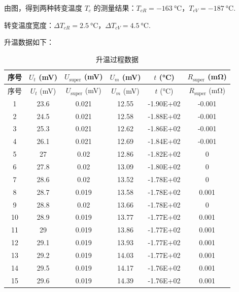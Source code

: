 \documentclass{THUexprep}
\begin{document}
由图，得到两种转变温度 $T_c$ 的测量结果：$T_{cR}=\SI{-163}{\celsius}$，$T_{cV}=\SI{-187}{\celsius}$.

转变温度宽度：$\Delta T_{cR} = \SI{2.5}{\celsius}$，$\Delta T_{cV}=\SI{4.5}{\celsius}$.

升温数据如下：

\begin{longtable}{|c|c|c|c|c|c|}
    \caption{升温过程数据} \\
    \hline
    序号 & $U_t$ (\si{\milli\volt}) & $U_{\text{super}}$ (\si{\milli\volt})  & $U_m$ (\si{\milli\volt}) & $t$ (\si{\celsius})    & $R_\text{super}$ (\si{\milli\ohm}) \\
    \hline
    \endfirsthead
    \hline
    序号 & $U_t$ (\si{\milli\volt}) & $U_{\text{super}}$ (\si{\milli\volt})  & $U_m$ (\si{\milli\volt}) & $t$ (\si{\celsius})    & $R_\text{super}$ (\si{\milli\ohm}) \\
    \hline
    \endhead
    \hline
    1     & 23.6  & 0.021 & 12.55 & -1.90E+02 & -0.001 \\
    \hline
    2     & 24.5  & 0.021 & 12.58 & -1.88E+02 & -0.001 \\
    \hline
    3     & 25.3  & 0.021 & 12.62 & -1.86E+02 & -0.001 \\
    \hline
    4     & 26.1  & 0.021 & 12.69 & -1.84E+02 & -0.001 \\
    \hline
    5     & 27    & 0.02  & 12.86 & -1.82E+02 & 0 \\
    \hline
    6     & 27.8  & 0.02  & 13.09 & -1.80E+02 & 0 \\
    \hline
    7     & 28.6  & 0.02  & 13.52 & -1.78E+02 & 0 \\
    \hline
    8     & 28.7  & 0.019 & 13.58 & -1.78E+02 & 0.001 \\
    \hline
    9     & 28.8  & 0.02  & 13.66 & -1.78E+02 & 0 \\
    \hline
    10    & 28.9  & 0.019 & 13.77 & -1.77E+02 & 0.001 \\
    \hline
    11    & 29    & 0.019 & 13.86 & -1.77E+02 & 0.001 \\
    \hline
    12    & 29.1  & 0.019 & 13.93 & -1.77E+02 & 0.001 \\
    \hline
    13    & 29.2  & 0.019 & 14.03 & -1.77E+02 & 0.001 \\
    \hline
    14    & 29.5  & 0.019 & 14.17 & -1.76E+02 & 0.001 \\
    \hline
    15    & 29.6  & 0.019 & 14.39 & -1.76E+02 & 0.001 \\

\end{longtable}
\end{document}
